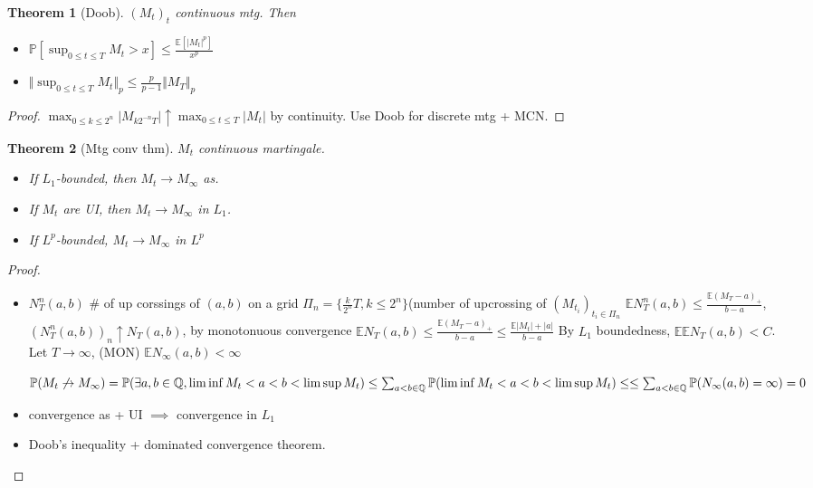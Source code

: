 \documentclass{article}
\newtheorem{theorem}{Theorem}
\newcommand{\esp}{{\mathbb E}}
\newcommand{\pr}{{\mathbb P}}
\newcommand{\norm}[1]{\Vert #1 \Vert}
\newcommand{\notconverge}{
  \mathrel{{\ooalign{\hidewidth$\not\phantom{=}$\hidewidth\cr$\rightarrow$}}}}
\begin{document}
\begin{theorem}[Doob]
  $(M_t)_t$ continuous mtg. Then
  \begin{itemize}
  \item $\pr[\sup_{0 \le t \le T} M_t  > x] \le \frac{\esp[|M_t|^p]}{x^p}$
  \item $\norm{\sup_{0 \le t \le T} M_t}_p \le \frac{p}{p-1}\norm{M_T}_p$
  \end{itemize}
\end{theorem}
\begin{proof}
  $\max_{0 \le k \le 2^n} |M_{k2^{-n}T}| \uparrow \max_{0 \le t \le T} |M_t|$ by continuity.
  Use Doob for discrete mtg + MCN.
\end{proof}

\begin{theorem}[Mtg conv thm]
  $M_t$ continuous martingale.
  \begin{itemize}
  \item If $L_1$-bounded, then $M_t \rightarrow M_{\infty}$ as.
  \item If $M_t$ are UI, then $M_t \rightarrow M_{\infty}$ in $L_1$.
  \item If $L^p$-bounded, $M_t \rightarrow M_{\infty}$ in $L^p$
  \end{itemize}
\end{theorem}
\begin{proof}
  \begin{itemize}
  \item $N_T^n(a, b)$ \# of up corssings of $(a, b)$ on a grid
    $\Pi_n = \{\frac{k}{2^n}T , k \le 2^n \}$(number of upcrossing of
    $(M_{t_i})_{t_i \in \Pi_n}$
    $\esp N_T^n(a, b) \le \frac{\esp (M_T - a)_+}{b- a}$,
    $(N_T^n(a, b))_n \uparrow N_T(a, b)$, by monotonuous convergence
    $\esp N_T(a, b) \le \frac{\esp (M_T - a)_+}{b- a} \le\frac{\esp
      |M_t| + |a|}{b- a}$ By $L_1$ boundedness,
    $\esp \esp N_T(a, b) < C$. Let $T \rightarrow \infty$, (MON)
    $\esp N_{\infty}(a, b) < \infty$

    $\pr(M_t \notconverge M_{\infty}) = \pr(\exists a, b \in \mathbb
    Q, \lim\inf M_t < a < b < \lim\sup M_t ) \le \sum_{a < b \in
      \mathbb Q} \pr( \lim\inf M_t < a < b < \lim\sup M_t ) \le \le
    \sum_{a < b \in \mathbb Q} \pr( N_{\infty}(a, b) = \infty) = 0$
  \item convergence as  + UI $\implies$ convergence in $L_1$
  \item Doob's inequality + dominated convergence theorem.
  \end{itemize}

\end{proof}
\end{document}
